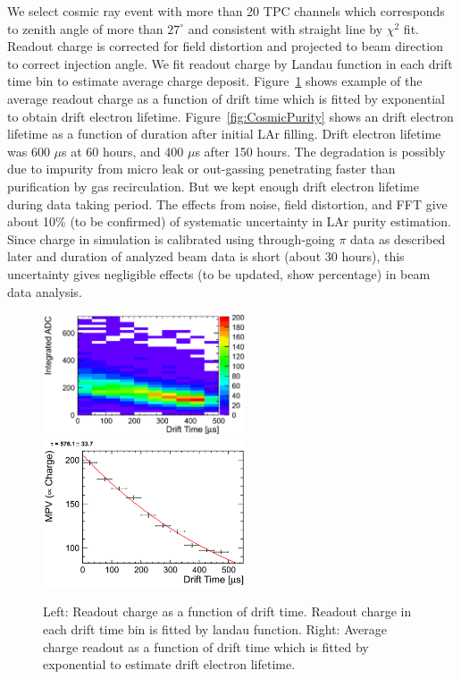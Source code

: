 We select cosmic ray event with more than 20 TPC channels which corresponds to zenith angle of more than $27^\circ$ and consistent with straight line by $\chi^2$ fit. 
Readout charge is corrected for field distortion and projected to beam direction to correct injection angle.
We fit readout charge by Landau function in each drift time bin to estimate average charge deposit. 
Figure~\ref{fig:tauExample} shows example of the average readout charge as a function of drift time which is fitted by exponential to obtain drift electron lifetime. 
Figure~\ref{fig:CosmicPurity} shows an drift electron lifetime as a function of duration after initial LAr filling.
Drift electron lifetime was 600 $\mu$s at 60 hours, and 400 $\mu$s after 150 hours.
The degradation is possibly due to impurity from micro leak or out-gassing penetrating faster than purification by gas recirculation.
But we kept enough drift electron lifetime during data taking period.
The effects from noise, field distortion, and FFT give about 10\% (to be confirmed) of systematic uncertainty in LAr purity estimation.
Since charge in simulation is calibrated using through-going $\pi$ data as described later and duration of analyzed beam data is short (about 30 hours), this uncertainty gives negligible effects (to be updated, show percentage) in beam data analysis. 

\begin{figure}[htbp]
 \begin{center}
  \includegraphics[width=60mm]{fig/chargeDep.eps}
  \includegraphics[width=60mm]{fig/tauExample.eps}
 \end{center}
 \caption{Left: Readout charge as a function of drift time. Readout charge in each drift time bin is fitted by landau function. Right: Average charge readout as a function of drift time which is fitted by exponential to estimate drift electron lifetime.}
 \label{fig:tauExample}
\end{figure}


